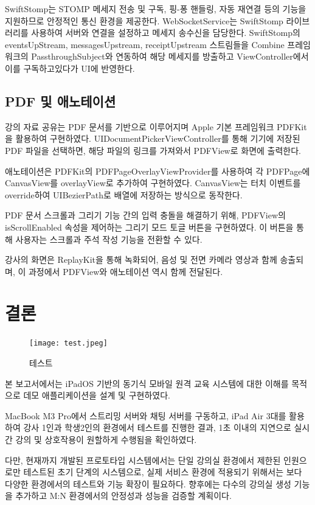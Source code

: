 \documentclass[10pt, a4paper, oneside]{article}
\begin{document}
SwiftStomp는 STOMP 메세지 전송 및 구독, 핑-퐁 핸들링, 자동 재연결 등의 기능을 지원하므로 안정적인 통신 환경을 제공한다. WebSocketService는 SwiftStomp 라이브러리를 사용하여 서버와 연결을 설정하고 메세지 송수신을 담당한다. SwiftStomp의 eventsUpStream, messagesUpstream, receiptUpstream 스트림들을 Combine 프레임워크의 PassthroughSubject와 연동하여 해당 메세지를 방출하고 ViewController에서 이를 구독하고있다가 UI에 반영한다.

\subsection{PDF 및 애노테이션}
강의 자료 공유는 PDF 문서를 기반으로 이루어지며 Apple 기본 프레임워크 PDFKit을 활용하여 구현하였다. UIDocumentPickerViewController를 통해 기기에 저장된 PDF 파일을 선택하면, 해당 파일의 링크를 가져와서 PDFView로 화면에 출력한다.

애노테이션은 PDFKit의 PDFPageOverlayViewProvider를 사용하여 각 PDFPage에 CanvasView를 overlayView로 추가하여 구현하였다. CanvasView는 터치 이벤트를 override하여 UIBezierPath로 배열에 저장하는 방식으로 동작한다.

PDF 문서 스크롤과 그리기 기능 간의 입력 충돌을 해결하기 위해, PDFView의 isScrollEnabled 속성을 제어하는 그리기 모드 토글 버튼을 구현하였다. 이 버튼을 통해 사용자는 스크롤과 주석 작성 기능을 전환할 수 있다.

강사의 화면은 ReplayKit을 통해 녹화되어, 음성 및 전면 카메라 영상과 함께 송출되며, 이 과정에서 PDFView와 애노테이션 역시 함께 전달된다.

\section{결론}
\begin{figure}[htbp]
    \begin{center}
    \texttt{[image: test.jpeg]}
    \caption{테스트}
    \label{fig:fig4}
    \end{center}
\end{figure}
\newpage
본 보고서에서는 iPadOS 기반의 동기식 모바일 원격 교육 시스템에 대한 이해를 목적으로 데모 애플리케이션을 설계 및 구현하였다.

MacBook M3 Pro에서 스트리밍 서버와 채팅 서버를 구동하고, iPad Air 3대를 활용하여 강사 1인과 학생2인의 환경에서 테스트를 진행한 결과, 1초 이내의 지연으로 실시간 강의 및 상호작용이 원할하게 수행됨을 확인하였다.

다만, 현재까지 개발된 프로토타입 시스템에서는 단일 강의실 환경에서 제한된 인원으로만 테스트된 초기 단계의 시스템으로, 실제 서비스 환경에 적용되기 위해서는 보다 다양한 환경에서의 테스트와 기능 확장이 필요하다. 향후에는 다수의 강의실 생성 기능을 추가하고 M:N 환경에서의 안정성과 성능을 검증할 계획이다.
\end{document}
